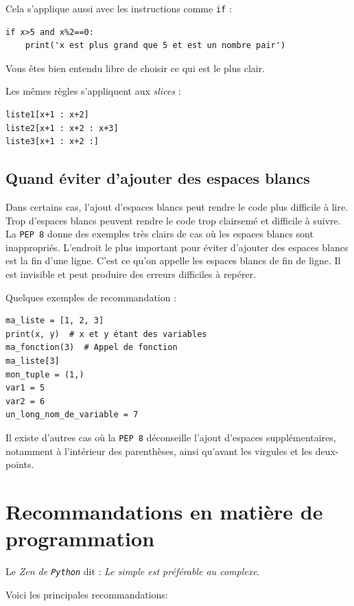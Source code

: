 \documentclass[a4paper,12pt]{book}
\begin{document}
Cela s'applique aussi avec les instructions comme \texttt{if} :
\begin{lstlisting}
if x>5 and x%2==0:
    print('x est plus grand que 5 et est un nombre pair')
\end{lstlisting}

Vous êtes bien entendu libre de choisir ce qui est le plus clair.
\medskip

Les mêmes règles s'appliquent aux \textit{slices} : 
\begin{lstlisting}
liste1[x+1 : x+2]
liste2[x+1 : x+2 : x+3]
liste3[x+1 : x+2 :]
\end{lstlisting}
\medskip

\subsection*{Quand éviter d'ajouter des espaces blancs}
Dans certains cas, l'ajout d'espaces blancs peut rendre le code plus difficile à lire. Trop d'espaces blancs peuvent rendre le code trop clairsemé et difficile à suivre. La \texttt{PEP 8} donne des exemples très clairs de cas où les espaces blancs sont inappropriés. L'endroit le plus important pour éviter d'ajouter des espaces blancs est la fin d'une ligne. C'est ce qu'on appelle les espaces blancs de fin de ligne. Il est invisible et peut produire des erreurs difficiles à repérer.
\medskip

Quelques exemples de recommandation :
\begin{lstlisting}
ma_liste = [1, 2, 3]
print(x, y)  # x et y étant des variables
ma_fonction(3)  # Appel de fonction
ma_liste[3]
mon_tuple = (1,)
var1 = 5
var2 = 6
un_long_nom_de_variable = 7
\end{lstlisting}
\medskip

Il existe d'autres cas où la \texttt{PEP 8} déconseille l'ajout d'espaces supplémentaires, notamment à l'intérieur des parenthèses, ainsi qu'avant les virgules et les deux-points.
\medskip

\section{Recommandations en matière de programmation
}
Le \textit{Zen de \texttt{Python}} dit : \og \textit{Le simple est préférable au complexe}\fg{}.
\medskip

Voici les principales recommandations:
\medskip
\end{document}

